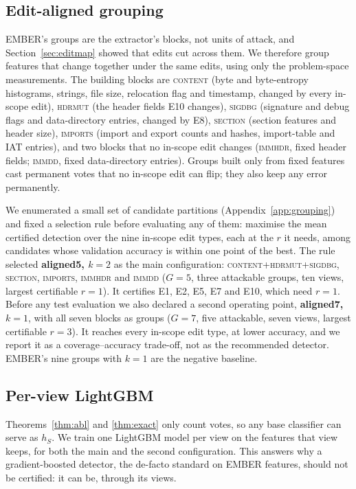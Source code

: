 \documentclass[preprint,12pt,authoryear]{elsarticle}
\begin{document}
\subsection{Edit-aligned grouping}\label{sec:grouping}
EMBER's groups are the extractor's blocks, not units of attack, and Section~\ref{sec:editmap} showed that edits cut across them. We therefore group features that change together under the same edits, using only the problem-space measurements. The building blocks are \textsc{content} (byte and byte-entropy histograms, strings, file size, relocation flag and timestamp, changed by every in-scope edit), \textsc{hdrmut} (the header fields E10 changes), \textsc{sigdbg} (signature and debug flags and data-directory entries, changed by E8), \textsc{section} (section features and header size), \textsc{imports} (import and export counts and hashes, import-table and IAT entries), and two blocks that no in-scope edit changes (\textsc{immhdr}, fixed header fields; \textsc{immdd}, fixed data-directory entries). Groups built only from fixed features cast permanent votes that no in-scope edit can flip; they also keep any error permanently.

We enumerated a small set of candidate partitions (Appendix~\ref{app:grouping}) and fixed a selection rule before evaluating any of them: maximise the mean certified detection over the nine in-scope edit types, each at the $r$ it needs, among candidates whose validation accuracy is within one point of the best. The rule selected \textbf{aligned5, $k=2$} as the main configuration: \textsc{content}+\textsc{hdrmut}+\textsc{sigdbg}, \textsc{section}, \textsc{imports}, \textsc{immhdr} and \textsc{immdd} ($G=5$, three attackable groups, ten views, largest certifiable $r=1$). It certifies E1, E2, E5, E7 and E10, which need $r=1$. Before any test evaluation we also declared a second operating point, \textbf{aligned7, $k=1$}, with all seven blocks as groups ($G=7$, five attackable, seven views, largest certifiable $r=3$). It reaches every in-scope edit type, at lower accuracy, and we report it as a coverage--accuracy trade-off, not as the recommended detector. EMBER's nine groups with $k=1$ are the negative baseline.

\subsection{Per-view LightGBM}\label{sec:lgbmviews}
Theorems~\ref{thm:abl} and \ref{thm:exact} only count votes, so any base classifier can serve as $h_S$. We train one LightGBM model \citep{ke2017lightgbm} per view on the features that view keeps, for both the main and the second configuration. This answers why a gradient-boosted detector, the de-facto standard on EMBER features, should not be certified: it can be, through its views.
\end{document}
